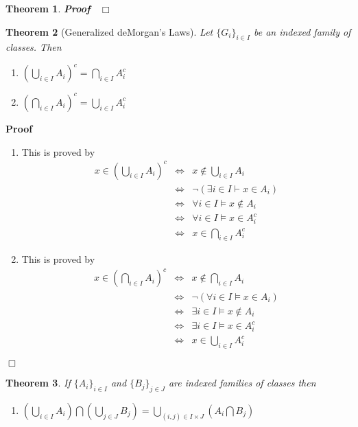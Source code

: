 \documentclass{book}
\newcommand{\nin}{\not\in}
\newenvironment{proof}{\noindent\textbf{Proof\ }}{\hspace*{\fill}$\Box$\medskip}
\newtheorem{theorem}{Theorem}
\begin{document}
{{\begin{theorem}
\begin{proof}
  \end{proof}
\end{theorem}

\begin{theorem}[Generalized deMorgan's Laws]
  \label{generalized deMorgan's Laws}{}Let
  $\{ G_i \}_{i \in I}$ be an indexed family of classes. Then
  \begin{enumerate}
    \item $\left( \bigcup_{i \in I} A_i \right)^c = \bigcap_{i \in I} A_i^c$
    
    \item $\left( \bigcap_{i \in I} A_i \right)^c = \bigcup_{i \in I} A_i^c$
  \end{enumerate}
\end{theorem}

\begin{proof}
  
  \begin{enumerate}
    \item This is proved by
    \begin{eqnarray*}
      x \in \left( \bigcup_{i \in I} A_i \right)^c & \Leftrightarrow & x \nin
      \bigcup_{i \in I} A_i\\
      & \Leftrightarrow & \neg (\exists i \in I \vdash x \in A_i)\\
      & \Leftrightarrow & \forall i \in I \vDash x \nin A_i\\
      & \Leftrightarrow & \forall i \in I \vDash x \in A_i^c\\
      & \Leftrightarrow & x \in \bigcap_{i \in I} A_i^c
    \end{eqnarray*}
    \item This is proved by
    \begin{eqnarray*}
      x \in \left( \bigcap_{i \in I} A_i \right)^c & \Leftrightarrow & x \nin
      \bigcap_{i \in I} A_i\\
      & \Leftrightarrow & \neg (\forall i \in I \vDash x \in A_i)\\
      & \Leftrightarrow & \exists i \in I \vDash x \nin A_i\\
      & \Leftrightarrow & \exists i \in I \vDash x \in A_i^c\\
      & \Leftrightarrow & x \in \bigcup_{i \in I} A_i^c
    \end{eqnarray*}
  \end{enumerate}
\end{proof}

\begin{theorem}
  \label{generalized distributive laws}If $\{ A_i \}_{i \in I}$ and $\{ B_j
  \}_{j \in J}$ are indexed families of classes then
  \begin{enumerate}
    \item $\left( \bigcup_{i \in I} A_i \right) \bigcap \left( \bigcup_{j \in
    J} B_j \right) = \bigcup_{(i, j) \in I \times J} \left( A_i \bigcap B_j
    \right)$
    

\end{enumerate}
\end{theorem}}}
\end{document}
